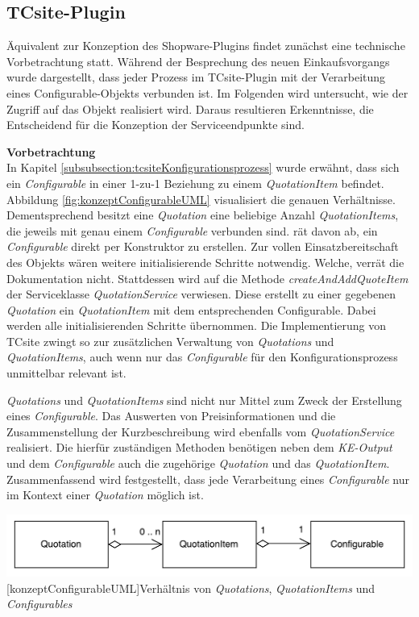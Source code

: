 \documentclass[12pt,a4paper,bibliography=totocnumbered,listof=totoc]{scrartcl}
\begin{document}
\subsection{TCsite-Plugin}
Äquivalent zur Konzeption des Shopware-Plugins findet zunächst eine technische Vorbetrachtung statt. Während der Besprechung des neuen Einkaufsvorgangs wurde dargestellt, dass jeder Prozess im TCsite-Plugin mit der Verarbeitung eines {Configurable}-Objekts verbunden ist. Im Folgenden wird untersucht, wie der Zugriff auf das Objekt realisiert wird. Daraus resultieren Erkenntnisse, die Entscheidend für die Konzeption der Serviceendpunkte sind.

\textbf{Vorbetrachtung}\\
In Kapitel \ref{subsubsection:tcsiteKonfigurationsprozess} wurde erwähnt, dass sich ein \emph{Configurable} in einer 1-zu-1 Beziehung zu einem \emph{QuotationItem} befindet. Abbildung \ref{fig:konzeptConfigurableUML} visualisiert die genauen Verhältnisse. Dementsprechend besitzt eine \emph{Quotation} eine beliebige Anzahl \emph{QuotationItems}, die jeweils mit genau einem \emph{Configurable} verbunden sind. \citet{tactonTCsiteDevelopmentManual} rät davon ab, ein \emph{Configurable} direkt per Konstruktor zu erstellen. Zur vollen Einsatzbereitschaft des Objekts wären weitere initialisierende Schritte notwendig. Welche, verrät die Dokumentation nicht. Stattdessen wird auf die Methode \emph{createAndAddQuoteItem} der Serviceklasse \emph{QuotationService} verwiesen.  Diese erstellt zu einer gegebenen \emph{Quotation} ein \emph{QuotationItem} mit dem entsprechenden Configurable.  Dabei werden alle initialisierenden Schritte übernommen. Die Implementierung von TCsite zwingt so zur zusätzlichen Verwaltung von \emph{Quotations} und \emph{QuotationItems}, auch wenn nur das \emph{Configurable} für den Konfigurationsprozess unmittelbar relevant ist.

\emph{Quotations} und \emph{QuotationItems} sind nicht nur Mittel zum Zweck der Erstellung eines \emph{Configurable}. Das Auswerten von Preisinformationen und die Zusammenstellung der Kurzbeschreibung wird ebenfalls vom \emph{QuotationService} realisiert. Die hierfür zuständigen Methoden benötigen neben dem \emph{KE-Output} und dem \emph{Configurable} auch die zugehörige \emph{Quotation} und das \emph{QuotationItem}. Zusammenfassend wird festgestellt, dass jede Verarbeitung eines \emph{Configurable} nur im Kontext einer \emph{Quotation} möglich ist.

\vspace{1em}
\begin{minipage}{\linewidth}
	\centering
	\includegraphics[width=1\linewidth]{Abbildungen/konzeptConfigurableUML.pdf}
	[konzeptConfigurableUML]{Verhältnis von \emph{Quotations}, \emph{QuotationItems} und \emph{Configurables}}
	\label{fig:konzeptConfigurableUML}
\end{minipage}
\vspace{1em}
\end{document}
